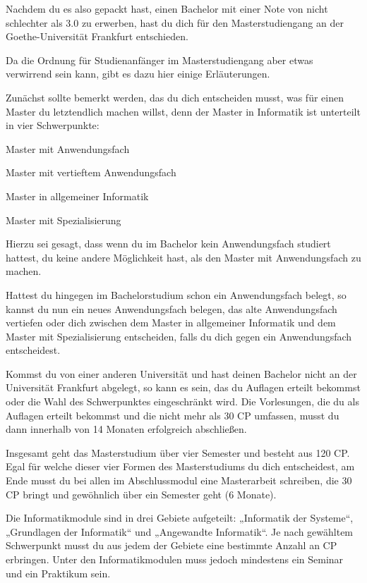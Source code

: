 \spaltenanfang
Nachdem du es also gepackt hast, einen Bachelor mit einer Note von nicht schlechter als 3.0 zu erwerben, hast du dich für den Masterstudiengang an der Goethe-Universität Frankfurt entschieden.


Da die Ordnung für Studienanfänger im Masterstudiengang aber etwas verwirrend sein kann, gibt es dazu hier einige Erläuterungen.


Zunächst sollte bemerkt werden, das du dich entscheiden musst, was für einen Master du letztendlich machen willst, denn der Master in Informatik ist unterteilt in vier Schwerpunkte:
\begin{noindEnumerate}
\item Master mit Anwendungsfach
\item Master mit vertieftem Anwendungsfach
\item Master in allgemeiner Informatik
\item Master mit Spezialisierung
\end{noindEnumerate}

Hierzu sei gesagt, dass wenn du im Bachelor kein Anwendungsfach studiert hattest, du keine andere Möglichkeit hast, als den Master mit Anwendungsfach zu machen.


Hattest du hingegen im Bachelorstudium schon ein Anwendungsfach belegt, so kannst du nun ein neues Anwendungsfach belegen, das alte Anwendungsfach vertiefen oder dich zwischen dem Master in allgemeiner Informatik und dem Master mit Spezialisierung entscheiden, falls du dich gegen ein Anwendungsfach entscheidest.


Kommst du von einer anderen Universität und hast deinen Bachelor nicht an der Universität Frankfurt abgelegt, so kann es sein, das du Auflagen erteilt bekommst oder die Wahl des Schwerpunktes eingeschränkt wird. Die Vorlesungen, die du als Auflagen erteilt bekommst und die nicht mehr als 30 CP umfassen, musst du dann innerhalb von 14 Monaten erfolgreich abschließen.


Insgesamt geht das Masterstudium über vier Semester und besteht aus 120 CP. Egal für welche dieser vier Formen des Masterstudiums du dich entscheidest, am Ende musst du bei allen im Abschlussmodul eine Masterarbeit schreiben, die 30 CP bringt und gewöhnlich über ein Semester geht (6 Monate).


Die Informatikmodule sind in drei Gebiete aufgeteilt: „Informatik der Systeme“, „Grundlagen der Informatik“ und „Angewandte Informatik“. Je nach gewähltem Schwerpunkt musst du aus jedem der Gebiete eine bestimmte Anzahl an CP erbringen. Unter den Informatikmodulen muss jedoch mindestens ein Seminar und ein Praktikum sein.


